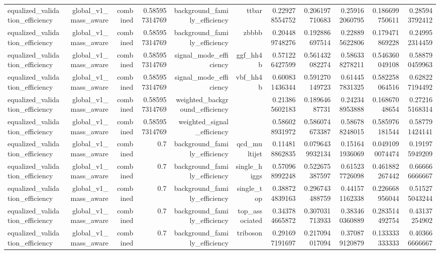 \begin{table}[htbp]
{\begin{tabular}{lrrrrrrrrrr}
equalized\_validation\_efficiency & global\_v1\_mass\_aware & combined & 0.585957314769 & background\_family\_efficiency & ttbar & 0.229278554752 & 0.206197710683 & 0.259162060795 & 0.186699750611 & 0.285943792412 \\
equalized\_validation\_efficiency & global\_v1\_mass\_aware & combined & 0.585957314769 & background\_family\_efficiency & zbbbb & 0.204489748276 & 0.192886697514 & 0.228895622806 & 0.179471869228 & 0.249952314459 \\
equalized\_validation\_efficiency & global\_v1\_mass\_aware & combined & 0.585957314769 & signal\_mode\_efficiency & ggf\_hh4b & 0.571226427599 & 0.561432082274 & 0.586338278211 & 0.546360049108 & 0.588790459963 \\
equalized\_validation\_efficiency & global\_v1\_mass\_aware & combined & 0.585957314769 & signal\_mode\_efficiency & vbf\_hh4b & 0.600831436344 & 0.591270149723 & 0.614457831325 & 0.582258064516 & 0.628227194492 \\
equalized\_validation\_efficiency & global\_v1\_mass\_aware & combined & 0.585957314769 & weighted\_background\_efficiency &  & 0.213865602183 & 0.18964687731 & 0.242348953888 & 0.16867048654 & 0.272165168314 \\
equalized\_validation\_efficiency & global\_v1\_mass\_aware & combined & 0.585957314769 & weighted\_signal\_efficiency &  & 0.586028931972 & 0.586074673387 & 0.586788248015 & 0.585976181544 & 0.587791424141 \\
equalized\_validation\_efficiency & global\_v1\_mass\_aware & combined & 0.7 & background\_family\_efficiency & qcd\_multijet & 0.114818862835 & 0.0796439932134 & 0.151641936069 & 0.0491090074474 & 0.191975949209 \\
equalized\_validation\_efficiency & global\_v1\_mass\_aware & combined & 0.7 & background\_family\_efficiency & single\_higgs & 0.570968992248 & 0.522675387597 & 0.615237726098 & 0.461882267442 & 0.666666666667 \\
equalized\_validation\_efficiency & global\_v1\_mass\_aware & combined & 0.7 & background\_family\_efficiency & single\_top & 0.388724839163 & 0.296743488759 & 0.441571162338 & 0.226668956044 & 0.515275043244 \\
equalized\_validation\_efficiency & global\_v1\_mass\_aware & combined & 0.7 & background\_family\_efficiency & top\_associated & 0.343784665872 & 0.307031713933 & 0.383460360889 & 0.283514492754 & 0.43137254902 \\
equalized\_validation\_efficiency & global\_v1\_mass\_aware & combined & 0.7 & background\_family\_efficiency & triboson & 0.291697191697 & 0.217094017094 & 0.370879120879 & 0.133333333333 & 0.403666666667 \\

\end{tabular}}
\end{table}

